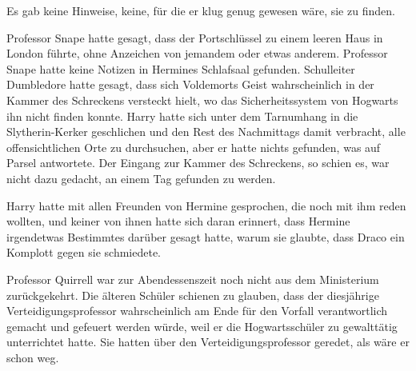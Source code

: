 Es gab keine Hinweise, keine, für die er klug genug gewesen wäre, sie zu finden.



Professor Snape hatte gesagt, dass der Portschlüssel zu einem leeren Haus in London führte, ohne Anzeichen von jemandem oder etwas anderem. Professor Snape hatte keine Notizen in Hermines Schlafsaal gefunden. Schulleiter Dumbledore hatte gesagt, dass sich Voldemorts Geist wahrscheinlich in der Kammer des Schreckens versteckt hielt, wo das Sicherheitssystem von Hogwarts ihn nicht finden konnte. Harry hatte sich unter dem Tarnumhang in die Slytherin-Kerker geschlichen und den Rest des Nachmittags damit verbracht, alle offensichtlichen Orte zu durchsuchen, aber er hatte nichts gefunden, was auf Parsel antwortete. Der Eingang zur Kammer des Schreckens, so schien es, war nicht dazu gedacht, an einem Tag gefunden zu werden.

Harry hatte mit allen Freunden von Hermine gesprochen, die noch mit ihm reden wollten, und keiner von ihnen hatte sich daran erinnert, dass Hermine irgendetwas Bestimmtes darüber gesagt hatte, warum sie glaubte, dass Draco ein Komplott gegen sie schmiedete.

Professor Quirrell war zur Abendessenszeit noch nicht aus dem Ministerium zurückgekehrt.
Die älteren Schüler schienen zu glauben, dass der diesjährige Verteidigungsprofessor wahrscheinlich am Ende für den Vorfall verantwortlich gemacht und gefeuert werden würde, weil er die Hogwartsschüler zu gewalttätig unterrichtet hatte. Sie hatten über den Verteidigungsprofessor geredet, als wäre er schon weg.

